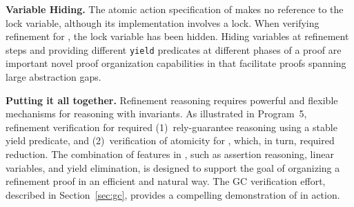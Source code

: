 {\bf Variable Hiding.} The atomic action specification of 
makes no reference to the lock variable, although its implementation
involves a lock. When verifying refinement for , the lock
variable has been hidden. Hiding variables at refinement steps and
providing different {\tt yield} predicates at different phases of a
proof are important novel proof organization capabilities in \civl
that facilitate proofs spanning large abstraction gaps.

{\bf Putting it all together.} 
Refinement reasoning requires powerful and
flexible mechanisms for reasoning with invariants.  
As illustrated in Program~5, refinement verification for  required 
(1)~rely-guarantee reasoning using a stable yield predicate, and 
(2)~verification of atomicity for , which, in turn, required reduction. 
The combination of features in \civl, such as assertion reasoning, linear variables, and yield elimination,
is designed to support the goal of organizing a
refinement proof in an efficient and natural way.
The GC verification effort, described in Section~\ref{sec:gc}, provides a compelling demonstration of \civl in action.



